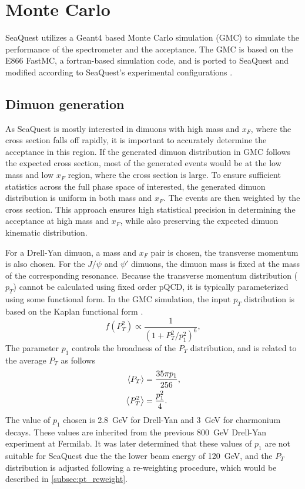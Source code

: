 \documentclass[../main.tex]{subfiles}
\begin{document}
\section{Monte Carlo}
\label{sec:MC}
SeaQuest utilizes a Geant4 based Monte Carlo simulation (GMC) to simulate the
performance of the spectrometer and the acceptance. The GMC is based on the
E866 FastMC, a fortran-based simulation code, and is ported to SeaQuest and
modified according to SeaQuest’s experimental configurations \cite{kerns2018,prasad2020}.

\subsection{Dimuon generation}
As SeaQuest is mostly interested in dimuons with high mass and $x_F$, where the cross section
falls off rapidly, it is important to accurately determine the acceptance in this region.
If the generated dimuon distribution in GMC follows the expected cross section, most of the
generated events would be at the low mass and low $x_F$ region, where the cross section is large.
To ensure sufficient statistics across the full phase space of interested, the generated dimuon
distribution is uniform in both mass and $x_F$. The events are then weighted by the cross
section. This approach ensures high statistical precision in determining the acceptance
at high mass and $x_F$, while also preserving the expected dimuon kinematic distribution.

For a Drell-Yan dimuon, a mass and $x_F$ pair is chosen, the transverse momentum is also chosen.
For the $J/\psi$ and $\psi'$ dimuons, the dimuon mass is fixed at the mass of the corresponding
resonance.
Because the transverse momentum distribution ($p_T$) cannot be calculated using
fixed order pQCD, it is typically parameterized using some functional form.
In the GMC simulation, the input $p_T$ distribution is based on the
Kaplan functional form \cite{kaplan1978}.
\begin{equation}
	f\left(P_T^2\right) \propto \frac{1}{\left(1+ P_T^2/p_1^2\right)^6},
	\label{eq:kaplan}
\end{equation}
The parameter $p_1$ controls the broadness of the $P_T$ distribution, and is
related to the average $P_T$ as follows
\begin{equation}
	\begin{split}
		\expval{P_T}   & = \frac{35\pi p_1}{256}, \\
		\expval{P_T^2} & = \frac{p_1^2}{4}.
		\label{eq:kaplan_mean}
	\end{split}
\end{equation}
The value of $p_1$ chosen is \SI{2.8}{\GeV} for Drell-Yan and \SI{3}{\GeV} for charmonium
decays. These values are inherited from the previous \SI{800}{\GeV} Drell-Yan experiment at Fermilab.
It was later determined that these values of $p_1$ are not suitable for SeaQuest due the the lower
beam energy of \SI{120}{\GeV}, and the $P_T$ distribution is adjusted following a re-weighting procedure, which
would be described in \cref{subsec:pt_reweight}.
\end{document}
